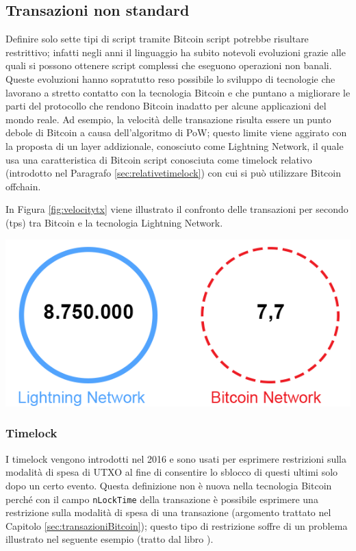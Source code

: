\subsection{Transazioni non standard} \label{sec:noStrandardScript}
Definire solo sette tipi di script tramite Bitcoin script potrebbe risultare restrittivo; infatti negli anni il linguaggio ha subito notevoli evoluzioni grazie alle quali si possono ottenere script complessi che eseguono operazioni non banali. Queste evoluzioni hanno sopratutto reso possibile lo sviluppo di tecnologie che lavorano a stretto contatto con la tecnologia Bitcoin e che puntano a migliorare le parti del protocollo che rendono Bitcoin inadatto per alcune applicazioni del mondo reale. Ad esempio, la velocità delle transazione risulta essere un punto debole di Bitcoin a causa dell’algoritmo di PoW; questo limite viene aggirato con la proposta di un layer addizionale, conosciuto come Lightning Network, il quale usa una caratteristica di Bitcoin script conosciuta come timelock relativo (introdotto nel Paragrafo \ref{sec:relativetimelock}) con cui si può utilizzare Bitcoin offchain.

In Figura \ref{fig:velocitytx} viene illustrato il confronto delle transazioni per secondo (tps) tra Bitcoin e la tecnologia Lightning Network.

{\centering
\includegraphics[scale=1.2]{images/Lightning-Network-study.png}
\par}

\subsubsection{Timelock}

I timelock vengono introdotti nel 2016 e sono usati per esprimere restrizioni sulla modalità di spesa di UTXO al fine di consentire lo sblocco di questi ultimi solo dopo un certo evento. Questa definizione non è nuova nella tecnologia Bitcoin perché con il campo {\tt{nLockTime}} della transazione è possibile esprimere una restrizione sulla modalità di spesa di una transazione (argomento trattato nel Capitolo \ref{sec:transazioniBitcoin}); questo tipo di restrizione soffre di un problema illustrato nel seguente esempio (tratto dal libro \cite{bitcoinbook}).

